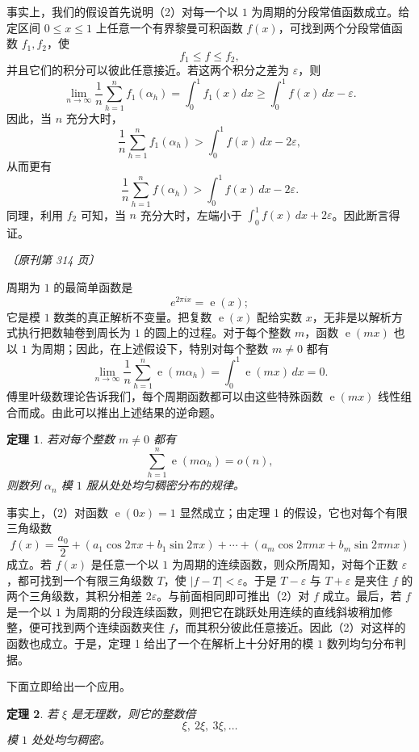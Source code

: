 \documentclass[UTF8,11pt,a4paper,fontset=none]{ctexart}
\theoremstyle{weylthm}
\newtheorem{theorem}{定理}
\newcommand{\e}{\operatorname{e}}
\newcommand{\origpage}[1]{%
  \par\vspace{0.7em}\noindent\hfill{\small\itshape〔原刊第 #1 页〕}\par\vspace{0.25em}}
\begin{document}
事实上，我们的假设首先说明（2）对每一个以 \(1\) 为周期的分段常值函数成立。给定区间 \(0\leq x\leq1\) 上任意一个有界黎曼可积函数 \(f(x)\)，可找到两个分段常值函数 \(f_1,f_2\)，使
\[
  f_1\leq f\leq f_2,
\]
并且它们的积分可以彼此任意接近。若这两个积分之差为 \(\varepsilon\)，则
\[
  \lim_{n\to\infty}\frac1n\sum_{h=1}^{n}f_1(\alpha_h)
  =\int_0^1f_1(x)\,dx
  \geq\int_0^1f(x)\,dx-\varepsilon.
\]
因此，当 \(n\) 充分大时，
\[
  \frac1n\sum_{h=1}^{n}f_1(\alpha_h)
  >\int_0^1f(x)\,dx-2\varepsilon,
\]
从而更有
\[
  \frac1n\sum_{h=1}^{n}f(\alpha_h)
  >\int_0^1f(x)\,dx-2\varepsilon.
\]
同理，利用 \(f_2\) 可知，当 \(n\) 充分大时，左端小于
\(\int_0^1f(x)\,dx+2\varepsilon\)。因此断言得证。

\origpage{314}

周期为 \(1\) 的最简单函数是
\[
  e^{2\pi i x}=\e(x);
\]
它是模 \(1\) 数类的真正解析不变量。把复数 \(\e(x)\) 配给实数 \(x\)，无非是以解析方式执行把数轴卷到周长为 \(1\) 的圆上的过程。对于每个整数 \(m\)，函数 \(\e(mx)\) 也以 \(1\) 为周期；因此，在上述假设下，特别对每个整数 \(m\neq0\) 都有
\[
  \lim_{n\to\infty}\frac1n\sum_{h=1}^{n}\e(m\alpha_h)
  =\int_0^1\e(mx)\,dx=0.
\]
傅里叶级数理论告诉我们，每个周期函数都可以由这些特殊函数 \(\e(mx)\) 线性组合而成。由此可以推出上述结果的逆命题。

\begin{theorem}
若对每个整数 \(m\neq0\) 都有
\[
  \sum_{h=1}^{n}\e(m\alpha_h)=o(n),
\]
则数列 \(\alpha_n\) 模 \(1\) 服从处处均匀稠密分布的规律。
\end{theorem}

事实上，（2）对函数 \(\e(0x)=1\) 显然成立；由定理 1 的假设，它也对每个有限三角级数
\[
  f(x)=\frac{a_0}{2}+(a_1\cos2\pi x+b_1\sin2\pi x)+\cdots
  +(a_m\cos2\pi mx+b_m\sin2\pi mx)
\]
成立。若 \(f(x)\) 是任意一个以 \(1\) 为周期的连续函数，则众所周知，对每个正数 \(\varepsilon\)，都可找到一个有限三角级数 \(T\)，使
\(|f-T|<\varepsilon\)。于是 \(T-\varepsilon\) 与 \(T+\varepsilon\) 是夹住 \(f\) 的两个三角级数，其积分相差 \(2\varepsilon\)。与前面相同即可推出（2）对 \(f\) 成立。最后，若 \(f\) 是一个以 \(1\) 为周期的分段连续函数，则把它在跳跃处用连续的直线斜坡稍加修整，便可找到两个连续函数夹住 \(f\)，而其积分彼此任意接近。因此（2）对这样的函数也成立。于是，定理 1 给出了一个在解析上十分好用的模 \(1\) 数列均匀分布判据。

下面立即给出一个应用。

\begin{theorem}
若 \(\xi\) 是无理数，则它的整数倍
\[
  \xi,\ 2\xi,\ 3\xi,\ldots
\]
模 \(1\) 处处均匀稠密。
\end{theorem}
\end{document}

